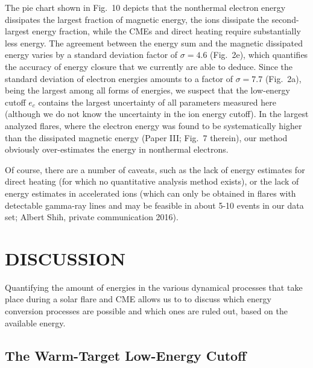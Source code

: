 \documentclass[10pt,preprint]{aastex}  %
\begin{document}
The pie chart shown in Fig.~10 depicts that the nonthermal 
electron energy dissipates the largest fraction of magnetic 
energy, the ions dissipate the second-largest energy fraction, 
while the CMEs and direct heating require substantially less energy.
The agreement between the energy sum and the magnetic dissipated
energy varies by a standard deviation factor of $\sigma=4.6$
(Fig.~2e), which quantifies the accuracy of energy closure
that we currently are able to deduce. Since the standard deviation
of electron energies amounts to a factor of $\sigma=7.7$ (Fig.~2a),
being the largest among all forms of energies, we suspect that the
low-energy cutoff $e_c$ contains the largest uncertainty of all
parameters measured here (although we do not know the uncertainty
in the ion energy cutoff). In the largest analyzed flares,
where the electron energy was found to be systematically higher
than the dissipated magnetic energy (Paper III; Fig.~7 therein),
our method obviously over-estimates the energy in nonthermal
electrons.

Of course, there are a number of caveats,
such as the lack of energy estimates for direct heating (for which
no quantitative analysis method exists), or the lack of energy estimates
in accelerated ions (which can only be obtained in flares with
detectable gamma-ray lines and may be feasible in about 5-10
events in our data set; Albert Shih, private communication 2016).

\section{	DISCUSSION 					}

Quantifying the amount of energies in the various dynamical processes
that take place during a solar flare and CME allows us to 
to discuss which energy conversion processes are possible and which
ones are ruled out, based on the available energy. 

\subsection{	The Warm-Target Low-Energy Cutoff 		}
\end{document}
